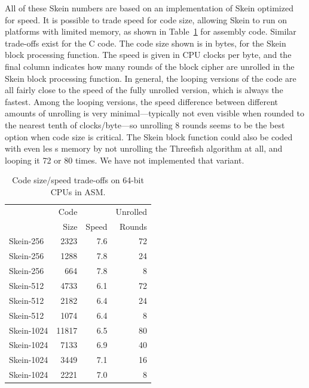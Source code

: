 \documentclass[11pt,twoside]{article}
\begin{document}
All of these Skein numbers are based on an implementation of Skein optimized for speed.  It is possible to trade speed for code size, allowing Skein to run on platforms with limited memory, as shown in Table~\ref{tab:SizeSpeedTrade-offs} for assembly code. Similar trade-offs exist for the C code. The code size shown is in bytes, for the Skein block processing function. The speed is given in CPU clocks per byte, and the final column indicates how many rounds of the block cipher are unrolled in the Skein block processing function. In general, the looping versions of the code are all fairly close to the speed of the fully unrolled version, which is always the fastest. Among the looping versions, the speed difference between different amounts of unrolling is very minimal---typically not even visible when rounded to the nearest tenth of clocks/byte---so unrolling 8 rounds seems to be the best option when code size is critical.  The Skein block function could also be coded with even les
s memory by not unrolling the Threefish algorithm at all, and looping it 72 or 80 times.  We have not implemented that variant.
%
\begin{table}[htb]
  \begin{center}
    \begin{tabular}{|l|r|r|r|}
    \hline
                     &    Code &     & Unrolled \\
                     &    Size &Speed& Rounds \\
        \hline				
          Skein-256  &	  2323 & 7.6 & 72 \\
          Skein-256  &	  1288 & 7.8 & 24 \\
          Skein-256  &	   664 & 7.8 &  8 \\
        \hline			  		
          Skein-512  &	  4733 & 6.1 & 72 \\
          Skein-512  &	  2182 & 6.4 & 24 \\
          Skein-512  &	  1074 & 6.4 &  8 \\
        \hline		  		
          Skein-1024 &	 11817 & 6.5 & 80 \\
          Skein-1024 &	  7133 & 6.9 & 40 \\
          Skein-1024 &	  3449 & 7.1 & 16 \\
          Skein-1024 &	  2221 & 7.0 &  8 \\
    \hline
    \end{tabular}
   \end{center}\caption{Code size/speed trade-offs on 64-bit CPUs in ASM.}
  \label{tab:SizeSpeedTrade-offs}
\end{table}
\end{document}
